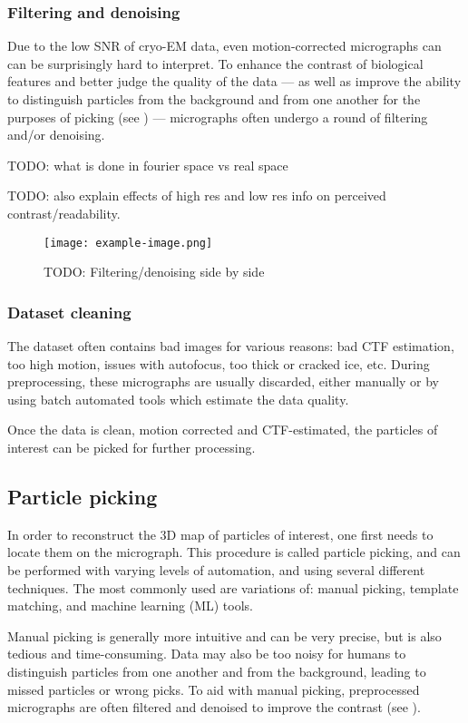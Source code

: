 \subsubsection{Filtering and denoising}\label{em_filtering_and_denoising}

Due to the low SNR of cryo-EM data, even motion-corrected micrographs can can be surprisingly hard to interpret.
To enhance the contrast of biological features and better judge the quality of the data --- as well as improve the ability to distinguish particles from the background and from one another for the purposes of picking (see ) --- micrographs often undergo a round of filtering and/or denoising.

TODO: what is done in fourier space vs real space

TODO: also explain effects of high res and low res info on perceived contrast/readability.

\begin{figure}[ht]
    \centering
    \texttt{[image: example-image.png]}
    \caption{TODO: Filtering/denoising side by side}
    \label{fig:em_filtering}
\end{figure}

\subsubsection{Dataset cleaning}
The dataset often contains bad images for various reasons: bad CTF estimation, too high motion, issues with autofocus, too thick or cracked ice, etc.
During preprocessing, these micrographs are usually discarded, either manually or by using batch automated tools which estimate the data quality.

Once the data is clean, motion corrected and CTF-estimated, the particles of interest can be picked for further processing.

\subsection{Particle picking}\label{em_particle_picking}
In order to reconstruct the 3D map of particles of interest, one first needs to locate them on the micrograph.
This procedure is called particle picking, and can be performed with varying levels of automation, and using several different techniques.
The most commonly used are variations of: manual picking, template matching, and machine learning (ML) tools.

Manual picking is generally more intuitive and can be very precise, but is also tedious and time-consuming.
Data may also be too noisy for humans to distinguish particles from one another and from the background, leading to missed particles or wrong picks.
To aid with manual picking, preprocessed micrographs are often filtered and denoised to improve the contrast (see ).

